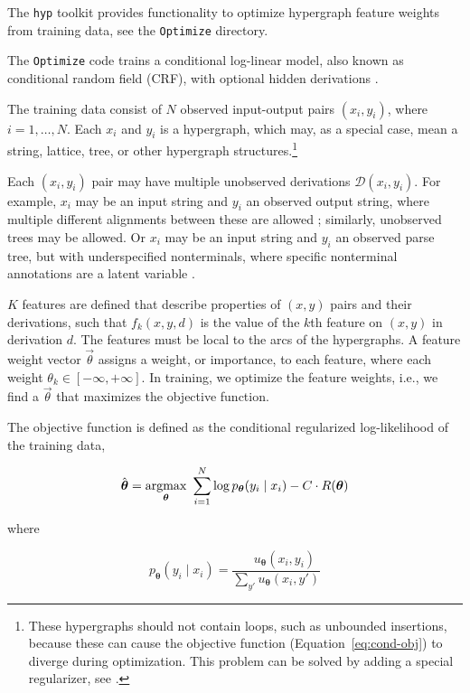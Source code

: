 \documentclass[12pt]{article}
\newcommand{\hyp}{\texttt{hyp}\xspace}
\newcommand{\vtheta}{\boldsymbol{\theta}}
\newcommand{\ptheta}{p_{\vtheta}}
\newcommand{\utheta}{u_{\vtheta}}
\newcommand\argmax{\operatornamewithlimits{argmax}}
\renewcommand{\eqref}[1]{Equation~\ref{eq:#1}}
\let\cite\citep    %
\let\newcite\citet %
\begin{document}
The \hyp toolkit provides functionality to optimize hypergraph feature
weights from training data, see the \texttt{Optimize} directory.

The \texttt{Optimize} code trains a conditional log-linear model, also
known as conditional random field (CRF), with optional hidden
derivations \cite{lafferty01, quattoni-et-al:2007:latent-crf}.

The training data consist of $N$ observed input-output pairs $(x_i,
y_i)$, where $i=1,\dots,N$. Each $x_i$ and $y_i$ is a hypergraph,
which may, as a special case, mean a string, lattice, tree, or other
hypergraph structures.\footnote{These hypergraphs should not contain
  loops, such as unbounded insertions, because these can cause the
  objective function (\eqref{cond-obj}) to diverge during
  optimization. This problem can be solved by adding a special
  regularizer, see \newcite{dreyer-thesis}.}

Each $(x_i, y_i)$ pair may have multiple unobserved derivations
$\mathcal{D}(x_i,y_i)$. For example, $x_i$ may be an input string and
$y_i$ an observed output string, where multiple different alignments
between these are allowed \cite{dreyer-smith-eisner:2008:emnlp};
similarly, unobserved trees may be allowed. Or $x_i$ may be an input
string and $y_i$ an observed parse tree, but with underspecified
nonterminals, where specific nonterminal annotations are a latent
variable \cite{petrov_klein_2008}.

$K$ features are defined that describe properties of $(x, y)$ pairs
and their derivations, such that $f_k(x,y,d)$ is the value of the
$k$th feature on $(x,y)$ in derivation $d$. The features must be local
to the arcs of the hypergraphs. A feature weight vector $\vec{\theta}$
assigns a weight, or importance, to each feature, where each weight
$\theta_k \in [-\infty, +\infty]$. In training, we optimize the
feature weights,
i.e., we find a $\vec{\theta}$ that maximizes the objective function.

The objective function is defined as the conditional regularized
log-likelihood of the training data,

\begin{equation}\label{eq:cond-obj}
  \hat{\vtheta} = \argmax_{\vtheta} \ \sum_{i=1}^N \log\ptheta(y_i\mid
  x_i) - C \cdot R(\vtheta)
\end{equation}

where

\begin{equation}\label{eq:cond-obj-i}
  \ptheta(y_i \mid x_i) =
  \frac{\ \ \ \ \ \ \utheta(x_i,y_i)}{\sum_{y'}\utheta(x_i, y') }
\end{equation}
\end{document}
